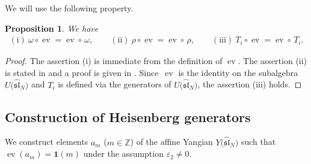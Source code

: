 \documentclass[pdftex]{sigma}
\newtheorem{prop}[thm]{Proposition}
\theoremstyle{definition}
\numberwithin{equation}{section}
\DeclareMathOperator{\ev}{ev}
\newcommand{\ve}{\varepsilon}
\newcommand{\bbZ}{\mathbb{Z}}
\newcommand{\affY}{Y\big(\affsl\big)}
\newcommand{\affsl}{\hat{\mathfrak{sl}}_N}
\newcommand{\bfid}{\mathbf{1}}
\begin{document}
We will use the following property.
\begin{prop}\label{prop:ev_and_auto}We have
\begin{gather*}
\mathrm{(i)}\ \omega \circ \ev = \ev \circ \,\omega, \qquad \mathrm{(ii)}\ \rho \circ \ev = \ev \circ\, \rho,\qquad \mathrm{(iii)}\ T_i \circ \ev = \ev \circ\, T_i.
\end{gather*}
\end{prop}
\begin{proof}The assertion (i) is immediate from the definition of $\ev$. The assertion (ii) is stated in \cite[Section~6, p.~463]{MR2323534} and a proof is given in \cite[Proposition~3.6]{kodera_evaluation}. Since~$\ev$ is the identity on the subalgebra $U\big(\affsl\big)$ and $T_i$ is defined via the generators of $U\big(\affsl\big)$, the assertion (iii) holds.
\end{proof}

\subsection{Construction of Heisenberg generators}

We construct elements $a_m$ ($m \in \bbZ$) of the affine Yangian $\affY$ such that $\ev(a_m) = \bfid(m)$ under the assumption $\ve_2 \neq 0$.
\end{document}
